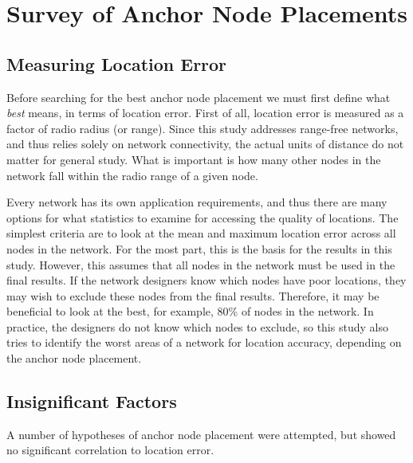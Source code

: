 \chapter{Survey of Anchor Node Placements}

\section{Measuring Location Error}
Before searching for the best anchor node placement we must first define what \emph{best} means, in terms of location error.  First of all, location error is measured as a factor of radio radius (or range).  Since this study addresses range-free networks, and thus relies solely on network connectivity, the actual units of distance do not matter for general study.  What is important is how many other nodes in the network fall within the radio range of a given node.  

Every network has its own application requirements, and thus there are many options for what statistics to examine for accessing the quality of locations.  The simplest criteria are to look at the mean and maximum location error across all nodes in the network.  For the most part, this is the basis for the results in this study.  However, this assumes that all nodes in the network must be used in the final results.  If the network designers know which nodes have poor locations, they may wish to exclude these nodes from the final results.  Therefore, it may be beneficial to look at the best, for example, 80\% of nodes in the network.  In practice, the designers do not know which nodes to exclude, so this study also tries to identify the worst areas of a network for location accuracy, depending on the anchor node placement.  

\section{Insignificant Factors}
A number of hypotheses of anchor node placement were attempted, but showed no significant correlation to location error.  

